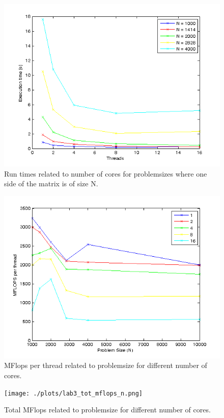 \documentclass[a4paper,11pt]{article}
\begin{document}
\begin{figure}[!h]
  \caption{Run times related to number of cores for problemsizes where one side of the matrix is of size N.}
  \label{runtime_vs_cores}
  \includegraphics[scale=0.9]{./plots/lab3_exec_t_threads.png}
\end{figure}

\begin{figure}[!h]
  \caption{MFlops per thread related to problemsize for different number of cores.}
  \label{flops_thread_vs_n}
  \includegraphics[scale=0.9]{./plots/lab3_mflops_per_thread_n.png}
\end{figure}

\begin{figure}[!h]
  \caption{Total MFlops related to problemsize for different number of cores.}
  \label{flops_vs_n}
  \texttt{[image: ./plots/lab3\_tot\_mflops\_n.png]}
\end{figure}
\clearpage
\end{document}
